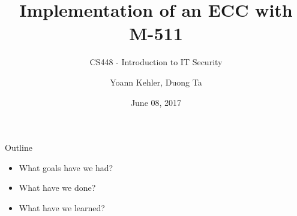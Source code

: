 \documentclass{beamer}
\begin{document}
\title{Implementation of an ECC with M-511} 
\subtitle{CS448 - Introduction to IT Security}
\author{Yoann Kehler, Duong Ta}
\date{June 08, 2017} 

\begin{frame}
\titlepage
\end{frame} 

\begin{frame}{Outline}
\begin{itemize}
	\item What goals have we had?
	\item What have we done?
	\item What have we learned?
\end{itemize}
\end{frame} 

%	
%
%		
%
\end{document}

